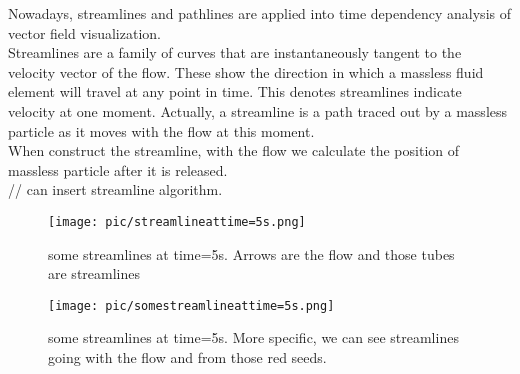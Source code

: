 \documentclass[
     11pt,         %
     a4paper,      %
     oneside,
     ]{article}
\begin{document}
  
	Nowadays, streamlines and pathlines are applied into time dependency analysis of vector field visualization. \\
	Streamlines are a family of curves that are instantaneously tangent to the velocity vector of the flow. These show the direction in which a massless fluid element will travel at any point in time\cite{StreamlineDefine}. This denotes streamlines indicate  velocity at one moment. Actually, a streamline is a path traced out by a massless particle as it moves with the flow at this moment.\\
	When construct the streamline, with the flow we calculate the position of massless particle after it is released.\\
	// can insert streamline algorithm.\\
	\begin{figure}[H]
	\centering
	\texttt{[image: pic/streamlineattime=5s.png]}
	\caption{{\tiny some streamlines at time=5s. Arrows are the flow and those tubes are streamlines}}
	\label{fig:streamlineattime=5s}
	\end{figure}
	\begin{figure}[H]
		\centering
		\texttt{[image: pic/somestreamlineattime=5s.png]}
		\caption{{\tiny some streamlines at time=5s. More specific, we can see streamlines going with the flow and from those red seeds.}}
		\label{fig:somestreamlineattime=5s}
	\end{figure}
	
\end{document}
